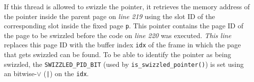 	If this thread is allowed to swizzle the pointer, it retrieves the memory address of the pointer inside the parent page on \emph{line 219} using the slot ID of the corresponding slot inside the fixed page \lstinline{p}. This pointer contains the page ID of the page to be swizzled before the code on \emph{line 220} was executed. \emph{This line} replaces this page ID with the buffer index \lstinline{idx} of the frame in which the page that gets swizzled can be found. To be able to identify the pointer as being swizzled, the \lstinline{SWIZZLED_PID_BIT} (used by \lstinline{is_swizzled_pointer()}) is set using an bitwise-$\vee$ (\lstinline{|}) on the \lstinline{idx}.
	

%	
%		
%		
%	
%	
